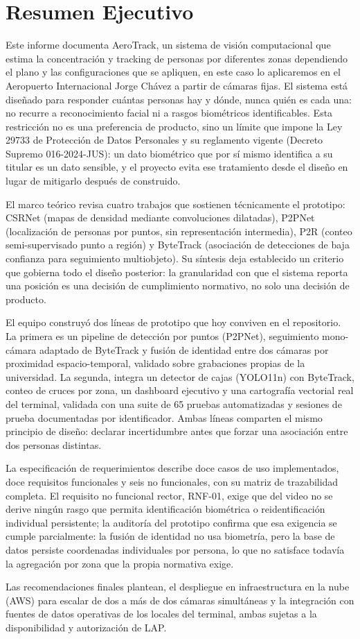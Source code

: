 \section{Resumen Ejecutivo}
\label{sec:resumen-ejecutivo}

Este informe documenta AeroTrack, un sistema de visión computacional que estima la
concentración y tracking de personas por diferentes zonas dependiendo el plano y las
configuraciones que se apliquen, en este caso lo aplicaremos en el Aeropuerto Internacional
Jorge Chávez a partir de cámaras fijas. El sistema está diseñado para responder cuántas
personas hay y dónde, nunca quién es cada una: no recurre a reconocimiento facial ni a rasgos
biométricos identificables. Esta restricción no es una preferencia de producto, sino un límite
que impone la Ley 29733 de Protección de Datos Personales y su reglamento vigente (Decreto
Supremo 016-2024-JUS): un dato biométrico que por sí mismo identifica a su titular es un dato
sensible, y el proyecto evita ese tratamiento desde el diseño en lugar de mitigarlo después de
construido.

El marco teórico revisa cuatro trabajos que sostienen técnicamente el prototipo: CSRNet
(mapas de densidad mediante convoluciones dilatadas), P2PNet (localización de personas por
puntos, sin representación intermedia), P2R (conteo semi-supervisado punto a región) y
ByteTrack (asociación de detecciones de baja confianza para seguimiento multiobjeto). Su
síntesis deja establecido un criterio que gobierna todo el diseño posterior: la granularidad con
que el sistema reporta una posición es una decisión de cumplimiento normativo, no solo una
decisión de producto.

El equipo construyó dos líneas de prototipo que hoy conviven en el repositorio. La primera
es un pipeline de detección por puntos (P2PNet), seguimiento mono-cámara adaptado de
ByteTrack y fusión de identidad entre dos cámaras por proximidad espacio-temporal, validado
sobre grabaciones propias de la universidad. La segunda, integra un detector de cajas
(YOLO11n) con ByteTrack, conteo de cruces por zona, un dashboard ejecutivo y una
cartografía vectorial real del terminal, validada con una suite de 65 pruebas automatizadas y
sesiones de prueba documentadas por identificador. Ambas líneas comparten el mismo
principio de diseño: declarar incertidumbre antes que forzar una asociación entre dos personas
distintas.

La especificación de requerimientos describe doce casos de uso implementados, doce
requisitos funcionales y seis no funcionales, con su matriz de trazabilidad completa. El
requisito no funcional rector, RNF-01, exige que del video no se derive ningún rasgo que
permita identificación biométrica o reidentificación individual persistente; la auditoría del
prototipo confirma que esa exigencia se cumple parcialmente: la fusión de identidad no usa
biometría, pero la base de datos persiste coordenadas individuales por persona, lo que no
satisface todavía la agregación por zona que la propia normativa exige.

Las recomendaciones finales plantean, el despliegue en infraestructura en la nube (AWS)
para escalar de dos a más de dos cámaras simultáneas y la integración con fuentes de datos
operativas de los locales del terminal, ambas sujetas a la disponibilidad y autorización de LAP.
